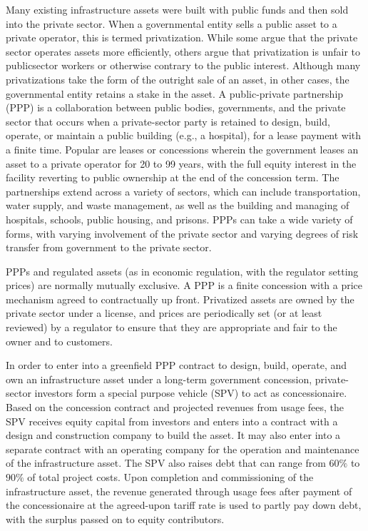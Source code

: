 \documentclass[11pt]{article}
\begin{document}
Many existing infrastructure assets were built with public funds and then sold into the private sector. When a governmental entity sells a public asset to a private operator, this is termed privatization. While some argue that the private sector operates assets more efficiently, others argue that privatization is unfair to publicsector workers or otherwise contrary to the public interest. Although many privatizations take the form of the outright sale of an asset, in other cases, the governmental entity retains a stake in the asset. A public-private partnership (PPP) is a collaboration between public bodies, governments, and the private sector that occurs when a private-sector party is retained to design, build, operate, or maintain a public building (e.g., a hospital), for a lease payment with a finite time. Popular are leases or concessions wherein the government leases an asset to a private operator for 20 to 99 years, with the full equity interest in the facility reverting to public ownership at the end of the concession term. The partnerships extend across a variety of sectors, which can include transportation, water supply, and waste management, as well as the building and managing of hospitals, schools, public housing, and prisons. PPPs can take a wide variety of forms, with varying involvement of the private sector and varying degrees of risk transfer from government to the private sector.

PPPs and regulated assets (as in economic regulation, with the regulator setting prices) are normally mutually exclusive. A PPP is a finite concession with a price mechanism agreed to contractually up front. Privatized assets are owned by the private sector under a license, and prices are periodically set (or at least reviewed) by a regulator to ensure that they are appropriate and fair to the owner and to customers.

In order to enter into a greenfield PPP contract to design, build, operate, and own an infrastructure asset under a long-term government concession, private-sector investors form a special purpose vehicle (SPV) to act as concessionaire. Based on the concession contract and projected revenues from usage fees, the SPV receives equity capital from investors and enters into a contract with a design and construction company to build the asset. It may also enter into a separate contract with an operating company for the operation and maintenance of the infrastructure asset. The SPV also raises debt that can range from $60 \%$ to $90 \%$ of total project costs. Upon completion and commissioning of the infrastructure asset, the revenue generated through usage fees after payment of the concessionaire at the agreed-upon tariff rate is used to partly pay down debt, with the surplus passed on to equity contributors.
\end{document}
